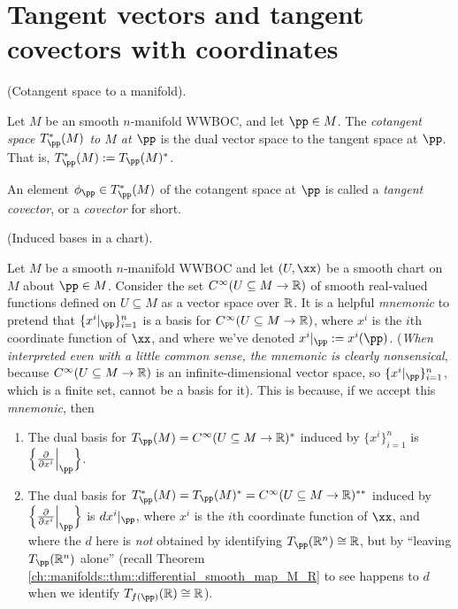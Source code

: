 \newpage 

\section{Tangent vectors and tangent covectors with coordinates}
\label{ch::manifolds::tangent_cotangent_with_coords}

\begin{defn}
\label{ch::manifolds::defn::cotangent_space}
     (Cotangent space to a manifold).
    
    Let $M$ be an smooth $n$-manifold WWBOC, and let $\pp \in M$. The \textit{cotangent space $T_\pp^*(M)$ to $M$ at $\pp$} is the dual vector space to the tangent space at $\pp$. That is, $T_\pp^*(M) := T_\pp(M)^*$.
    
    An element $\phi_\pp \in T_\pp^*(M)$ of the cotangent space at $\pp$ is called a \textit{tangent covector}, or a \textit{covector} for short.
\end{defn}

\begin{theorem}
\label{ch::manifolds::thm::induced_bases_in_a_chart}
    (Induced bases in a chart).
    
    Let $M$ be a smooth $n$-manifold WWBOC and let $(U, \xx)$ be a smooth chart on $M$ about $\pp \in M$. Consider the set $C^\infty(U \subseteq M \rightarrow \mathbb{R})$ of smooth real-valued functions defined on $U \subseteq M$ as a vector space over $\mathbb{R}$. It is a helpful \textit{mnemonic} to pretend that $\{x^i|_\pp\}_{i = 1}^n$ is a basis for $C^\infty(U \subseteq M \rightarrow \mathbb{R})$, where $x^i$ is the $i$th coordinate function of $\xx$, and where we've denoted $x^i|_\pp := x^i(\pp)$. (\textit{When interpreted even with a little common sense, the mnemonic is clearly nonsensical}, because $C^\infty(U \subseteq M \rightarrow \mathbb{R})$ is an infinite-dimensional vector space, so $\{x^i|_\pp\}_{i = 1}^n$, which is a finite set, cannot be a basis for it). This is because, if we accept this \textit{mnemonic}, then
    
    \begin{enumerate}
        \item The dual basis for $T_\pp(M) = C^\infty(U \subseteq M \rightarrow \R)^*$ induced by $\{x^i\}_{i = 1}^n$ is $\Big\{ \frac{\pd}{\pd x^i}\Big|_\pp \Big\}$.
        \item The dual basis for $T_\pp^*(M) = T_\pp(M)^* = C^\infty(U \subseteq M \rightarrow \R)^{**}$ induced by $\Big\{ \frac{\pd}{\pd x^i}\Big|_\pp \Big\}$ is $dx^i|_\pp$, where $x^i$ is the $i$th coordinate function of $\xx$, and where the $d$ here is \textit{not} obtained by identifying $T_\pp(\R^n) \cong \R$, but by ``leaving $T_\pp(\R^n)$ alone'' (recall Theorem \ref{ch::manifolds::thm::differential_smooth_map_M_R} to see happens to $d$ when we identify $T_{f(\pp)}(\R) \cong \R$).
    \end{enumerate}
\end{theorem}

